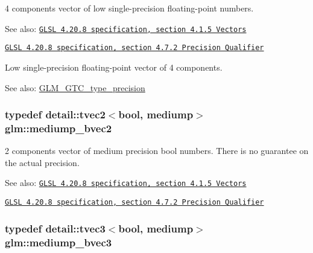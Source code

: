 4 components vector of low single-precision floating-point numbers.

\begin{Desc}
\item[See also:]\href{http://www.opengl.org/registry/doc/GLSLangSpec.4.20.8.pdf}{\tt GLSL 4.20.8 specification, section 4.1.5 Vectors} 

\href{http://www.opengl.org/registry/doc/GLSLangSpec.4.20.8.pdf}{\tt GLSL 4.20.8 specification, section 4.7.2 Precision Qualifier}\end{Desc}
Low single-precision floating-point vector of 4 components. \begin{Desc}
\item[See also:]\hyperlink{group__gtc__type__precision}{GLM\_\-GTC\_\-type\_\-precision} \end{Desc}
\hypertarget{group__core__precision_g1406d96eb96694d91052d3f882658ab2}{
\subsubsection[mediump\_\-bvec2]{\setlength{\rightskip}{0pt plus 5cm}typedef detail::tvec2$<$bool, mediump$>$ {\bf glm::mediump\_\-bvec2}}}
\label{group__core__precision_g1406d96eb96694d91052d3f882658ab2}


2 components vector of medium precision bool numbers. There is no guarantee on the actual precision.

\begin{Desc}
\item[See also:]\href{http://www.opengl.org/registry/doc/GLSLangSpec.4.20.8.pdf}{\tt GLSL 4.20.8 specification, section 4.1.5 Vectors} 

\href{http://www.opengl.org/registry/doc/GLSLangSpec.4.20.8.pdf}{\tt GLSL 4.20.8 specification, section 4.7.2 Precision Qualifier} \end{Desc}
\hypertarget{group__core__precision_ge7c8d0136e829d6fe3feb00856e35f11}{
\subsubsection[mediump\_\-bvec3]{\setlength{\rightskip}{0pt plus 5cm}typedef detail::tvec3$<$bool, mediump$>$ {\bf glm::mediump\_\-bvec3}}}
\label{group__core__precision_ge7c8d0136e829d6fe3feb00856e35f11}


